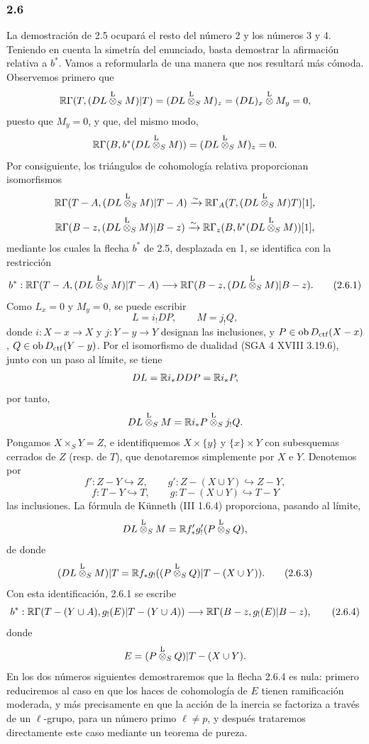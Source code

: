 \subsubsection*{2.6}
La demostración de 2.5 ocupará el resto del número 2 y los números 3 y 4. Teniendo en cuenta la simetría del enunciado, basta demostrar la afirmación relativa a $b^*$. Vamos a reformularla de una manera que nos resultará más cómoda. Observemos primero que
\[
\mathbb{R}\Gamma(T,(DL\overset{\mathrm L}{\otimes}_SM)|T)
 =(DL\overset{\mathrm L}{\otimes}_SM)_z
 =(DL)_x\overset{\mathrm L}{\otimes} M_y=0,
\]
puesto que $M_y=0$, y que, del mismo modo,
\[
\mathbb{R}\Gamma(B,b^*(DL\overset{\mathrm L}{\otimes}_SM))
 =(DL\overset{\mathrm L}{\otimes}_SM)_z=0.
\]
Por consiguiente, los triángulos de cohomología relativa proporcionan isomorfismos
\[
\mathbb{R}\Gamma(T-A,(DL\overset{\mathrm L}{\otimes}_SM)|T-A)
 \xrightarrow{\sim}
\mathbb{R}\Gamma_A(T,(DL\overset{\mathrm L}{\otimes}_SM)T)[1],
\]
\[
\mathbb{R}\Gamma(B-z,(DL\overset{\mathrm L}{\otimes}_SM)|B-z)
 \xrightarrow{\sim}
\mathbb{R}\Gamma_z(B,b^*(DL\overset{\mathrm L}{\otimes}_SM))[1],
\]
mediante los cuales la flecha $b^*$ de 2.5, desplazada en 1, se identifica con la restricción
\begin{equation}
b^*:\mathbb{R}\Gamma(T-A,(DL\overset{\mathrm L}{\otimes}_SM)|T-A)
 \longrightarrow \mathbb{R}\Gamma(B-z,(DL\overset{\mathrm L}{\otimes}_SM)|B-z).
\tag{2.6.1}
\end{equation}
Como $L_x=0$ y $M_y=0$, se puede escribir
\begin{equation}
L=i_!DP,\qquad M=j_!Q,
\tag{2.6.2}
\end{equation}
donde $i:X-x\to X$ y $j:Y-y\to Y$ designan las inclusiones, y $P\in\operatorname{ob} D_{\mathrm{ctf}}(X-x)$, $Q\in\operatorname{ob} D_{\mathrm{ctf}}(Y-y)$. Por el isomorfismo de dualidad (SGA 4 XVIII 3.19.6), junto con un paso al límite, se tiene
\[
DL=\mathbb{R} i_*DDP=\mathbb{R} i_*P,
\]
por tanto,
\[
DL\overset{\mathrm L}{\otimes}_SM=\mathbb{R} i_*P\overset{\mathrm L}{\otimes}_Sj_!Q.
\]
Pongamos $X\times_SY=Z$, e identifiquemos $X\times\{y\}$ y $\{x\}\times Y$ con subesquemas cerrados de $Z$ (resp. de $T$), que denotaremos simplemente por $X$ e $Y$. Denotemos por
\[
f':Z-Y\hookrightarrow Z,\qquad
g':Z-(X\cup Y)\hookrightarrow Z-Y,
\]
\[
f:T-Y\hookrightarrow T,\qquad
g:T-(X\cup Y)\hookrightarrow T-Y
\]
las inclusiones. La fórmula de Künneth (III 1.6.4) proporciona, pasando al límite,
\[
DL\overset{\mathrm L}{\otimes}_SM=\mathbb{R} f'_*g'_!(P\overset{\mathrm L}{\otimes}_SQ),
\]
de donde
\begin{equation}
(DL\overset{\mathrm L}{\otimes}_SM)|T=\mathbb{R} f_*g_!((P\overset{\mathrm L}{\otimes}_SQ)|T-(X\cup Y)).
\tag{2.6.3}
\end{equation}
Con esta identificación, 2.6.1 se escribe
\begin{equation}
b^*:\mathbb{R}\Gamma(T-(Y\cup A),g_!(E)|T-(Y\cup A))
 \longrightarrow \mathbb{R}\Gamma(B-z,g_!(E)|B-z),
\tag{2.6.4}
\end{equation}
donde
\[
E=(P\overset{\mathrm L}{\otimes}_SQ)|T-(X\cup Y).
\]
En los dos números siguientes demostraremos que la flecha 2.6.4 es nula: primero reduciremos al caso en que los haces de cohomología de $E$ tienen ramificación moderada, y más precisamente en que la acción de la inercia se factoriza a través de un $\ell$-grupo, para un número primo $\ell\ne p$, y después trataremos directamente este caso mediante un teorema de pureza.

